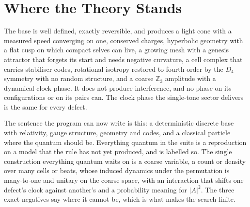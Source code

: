 \section{Where the Theory Stands}

The base is well defined, exactly reversible, and produces a light cone with a measured speed converging on one,
conserved charges, hyperbolic geometry with a flat cusp on which compact selves can live, a growing mesh with a
genesis attractor that forgets its start and needs negative curvature, a cell complex that carries stabiliser codes,
rotational isotropy restored to fourth order by the $D_4$ symmetry with no random structure, and a coarse
$\mathbb{Z}_3$ amplitude with a dynamical clock phase. It does not produce interference, and no phase on its
configurations or on its pairs can. The clock phase the single-tone sector delivers is the same for every defect.

The sentence the program can now write is this: a deterministic discrete base with relativity, gauge structure,
geometry and codes, and a classical particle where the quantum should be. Everything quantum in the suite is a
reproduction on a model that the rule has not yet produced, and is labelled so. The single construction everything
quantum waits on is a coarse variable, a count or density over many cells or beats, whose induced dynamics under the
permutation is many-to-one and unitary on the coarse space, with an interaction that shifts one defect's clock against
another's and a probability meaning for $|A|^2$. The three exact negatives say where it cannot be, which is what
makes the search finite.
